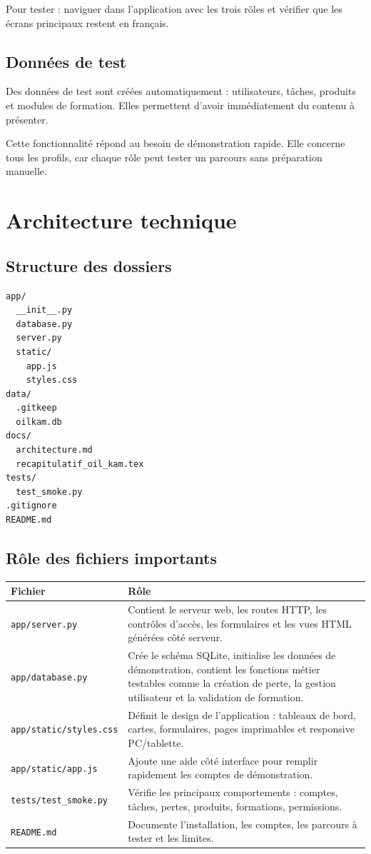 \documentclass[11pt,a4paper]{article}
\newcommand{\code}[1]{\texttt{#1}}
\begin{document}
Pour tester : naviguer dans l'application avec les trois rôles et vérifier que les écrans principaux restent en français.

\subsection{Données de test}

Des données de test sont créées automatiquement : utilisateurs, tâches, produits et modules de formation. Elles permettent d'avoir immédiatement du contenu à présenter.

Cette fonctionnalité répond au besoin de démonstration rapide. Elle concerne tous les profils, car chaque rôle peut tester un parcours sans préparation manuelle.

\section{Architecture technique}

\subsection{Structure des dossiers}

\begin{verbatim}
app/
  __init__.py
  database.py
  server.py
  static/
    app.js
    styles.css
data/
  .gitkeep
  oilkam.db
docs/
  architecture.md
  recapitulatif_oil_kam.tex
tests/
  test_smoke.py
.gitignore
README.md
\end{verbatim}

\subsection{Rôle des fichiers importants}

\begin{longtable}{|p{4cm}|p{10cm}|}
\hline
\textbf{Fichier} & \textbf{Rôle} \\
\hline
\code{app/server.py} & Contient le serveur web, les routes HTTP, les contrôles d'accès, les formulaires et les vues HTML générées côté serveur. \\
\hline
\code{app/database.py} & Crée le schéma SQLite, initialise les données de démonstration, contient les fonctions métier testables comme la création de perte, la gestion utilisateur et la validation de formation. \\
\hline
\code{app/static/styles.css} & Définit le design de l'application : tableaux de bord, cartes, formulaires, pages imprimables et responsive PC/tablette. \\
\hline
\code{app/static/app.js} & Ajoute une aide côté interface pour remplir rapidement les comptes de démonstration. \\
\hline
\code{tests/test\_smoke.py} & Vérifie les principaux comportements : comptes, tâches, pertes, produits, formations, permissions. \\
\hline
\code{README.md} & Documente l'installation, les comptes, les parcours à tester et les limites. \\
\hline
\end{longtable}
\end{document}
